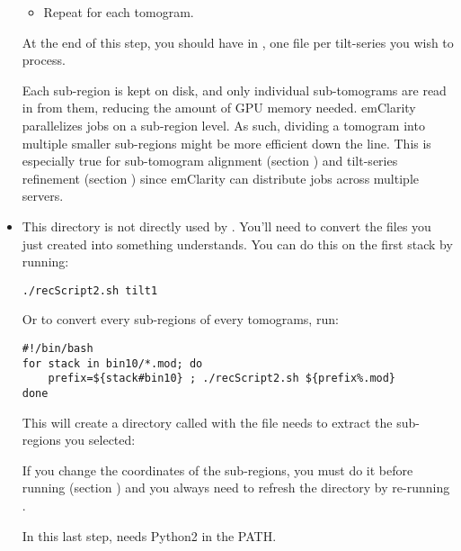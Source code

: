 \begin{itemize}
\begin{itemize}
        \item Repeat for each tomogram.
        
    \end{itemize}
    At the end of this step, you should have in , one  file per tilt-series you wish to process.

    \begin{note}Each sub-region is kept on disk, and only individual sub-tomograms are read in from them, reducing the amount of GPU memory needed. emClarity parallelizes jobs on a sub-region level. As such, dividing a tomogram into multiple smaller sub-regions might be more efficient down the line. This is especially true for sub-tomogram alignment (section ) and tilt-series refinement (section ) since emClarity can distribute jobs across multiple servers.
    \end{note}

    \item This  directory is not directly used by {\emClarity}. You'll need to convert the  files you just created into something {\emClarity} understands. You can do this on the first stack by running:
\begin{lstlisting}
./recScript2.sh tilt1
\end{lstlisting}
    Or to convert every sub-regions of every tomograms, run:
\begin{lstlisting}
#!/bin/bash
for stack in bin10/*.mod; do
    prefix=${stack#bin10} ; ./recScript2.sh ${prefix%.mod}
done
\end{lstlisting}

    This will create a directory called  with the file {\emClarity} needs to extract the sub-regions you selected:
    

    \begin{note}If you change the coordinates of the sub-regions, you must do it before running  (section ) and you always need to refresh the  directory by re-running .
    \end{note}
    
    \begin{note}In this last step,  needs Python2 in the PATH.
    \end{note}
\end{itemize}
